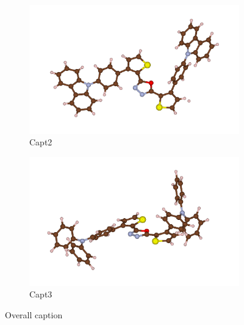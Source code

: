 \begin{figure}[htbp]
			\begin{subfigure}[t]{0.5\textwidth}
				\includegraphics[width=1\textwidth]{./Figures/K1.png}
				\caption{Capt2}
			\end{subfigure}%
			\begin{subfigure}[t]{0.5\textwidth}
				\includegraphics[width=1\textwidth]{./Figures/K2.png}
				\caption{Capt3}
			\end{subfigure} 
			\caption{Overall caption}
			\label{fig:fig05}
		\end{figure}


